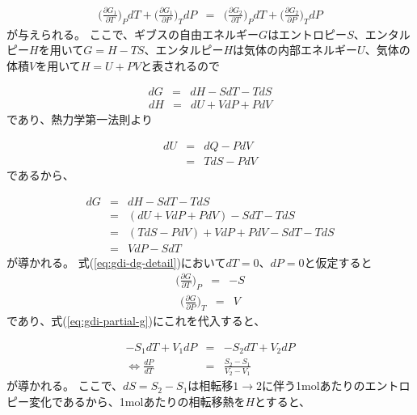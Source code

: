 \documentclass[titlepage]{jsreport}
\begin{document}
\large
\begin{eqnarray}
\bigg(\frac{\partial{G_1}}{\partial{T}}\bigg)_PdT + \bigg(\frac{\partial{G_1}}{\partial{P}}\bigg)_TdP &=& \bigg(\frac{\partial{G_2}}{\partial{T}}\bigg)_PdT + \bigg(\frac{\partial{G_2}}{\partial{P}}\bigg)_TdP \label{eq:gdi-partial-g}
\end{eqnarray}
\normalsize
が与えられる。
ここで、ギブスの自由エネルギー$G$はエントロピー$S$、エンタルピー$H$を用いて$G=H-TS$、エンタルピー$H$は気体の内部エネルギー$U$、気体の体積$V$を用いて$H=U+PV$と表されるので

\large
\begin{eqnarray}
dG &=& dH-SdT-TdS \label{eq:gdi-dg}
\end{eqnarray}
\begin{eqnarray}
dH &=& dU+VdP+PdV \label{eq:gdi-dh}
\end{eqnarray}
\normalsize
であり、熱力学第一法則より

\large
\begin{eqnarray}
dU &=& dQ-PdV \nonumber \\
   &=& TdS-PdV \label{eq:thermodynamics}
\end{eqnarray}
\normalsize
であるから、

\large
\begin{eqnarray}
dG &=& dH-SdT-TdS \nonumber\\
   &=& (dU+VdP+PdV)-SdT-TdS \nonumber\\
   &=& {(TdS-PdV)+VdP+PdV}-SdT-TdS \nonumber\\
   &=& VdP-SdT \label{eq:gdi-dg-detail}
\end{eqnarray}
\normalsize
が導かれる。
式(\ref{eq:gdi-dg-detail})において$dT=0$、$dP=0$と仮定すると
\large
\begin{eqnarray}
\bigg(\frac{\partial{G}}{\partial{T}}\bigg)_P &=& -S \label{eq:gdi-dg-dt}
\end{eqnarray}
\begin{eqnarray}
\bigg(\frac{\partial{G}}{\partial{P}}\bigg)_T &=& V \label{eq:gdi-dg-dp}
\end{eqnarray}
\normalsize
であり、式(\ref{eq:gdi-partial-g})にこれを代入すると、

\large
\begin{eqnarray}
-S_1dT+V_1dP &=& -S_2dT+V_2dP \nonumber \\
\Leftrightarrow \frac{dP}{dT} &=& \frac{S_2-S_1}{V_2-V_1} \label{eq:gdi-dp-dt}
\end{eqnarray}
\normalsize
が導かれる。
ここで、$dS=S_2-S_1$は相転移$1\rightarrow2$に伴う1molあたりのエントロピー変化であるから、1molあたりの相転移熱を$H$とすると、
\end{document}
